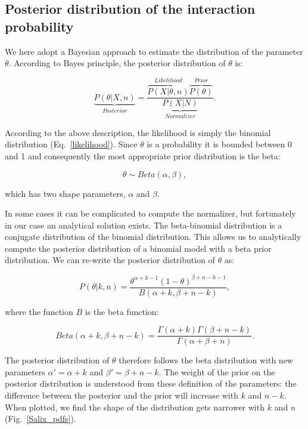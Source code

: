 ﻿\documentclass[12pt]{article}
\begin{document}
    \subsection*{Posterior distribution of the interaction probability}

      We here adopt a Bayesian approach to estimate the distribution of the parameter $\theta$. According to Bayes principle, the posterior distribution of $\theta$ is:

      \begin{equation}
        \underbrace{P(\theta|X,n)}_{Posterior} = \frac{\overbrace{P(X|\theta,n)}^{Likelihood}\overbrace{P(\theta)}^{Prior}}{\underbrace{P(X|N)}_{Normalizer}} .
        \label{posterior}
      \end{equation}

      According to the above description, the likelihood is simply the binomial distribution (Eq.~\ref{likelihood}). Since $\theta$ is a probability it is bounded between 0 and 1 and consequently the most appropriate prior distribution is the beta:

      \begin{equation}
        \theta \sim Beta(\alpha,\beta) , \label{prior}
      \end{equation}

      \noindent which has two shape parameters, $\alpha$ and $\beta$. 

     In some cases it can be complicated to compute the normalizer, but fortunately in our case an analytical solution exists. The beta-binomial distribution is a conjugate distribution of the binomial distribution. This allows us to analytically compute the posterior distribution of a binomial model with a beta prior distribution. We can re-write the posterior distribution of $\theta$ as:

      \begin{equation}
        P(\theta|k,n) = \frac{\theta^{\alpha+k-1}(1-\theta)^{\beta+n-k-1}}{B(\alpha+k,\beta+n-k)} , \label{posterior}
      \end{equation}

      \noindent where the function $B$ is the beta function:

      \begin{equation}
        Beta(\alpha+k,\beta+n-k) = \frac{\Gamma(\alpha+k)\Gamma(\beta+n-k)}{\Gamma(\alpha+\beta+n)} . \label{betafunction}
      \end{equation}

      The posterior distribution of $\theta$ therefore follows the beta distribution with new parameters $\alpha'= \alpha+k$ and $\beta'=\beta+n-k$. The weight of the prior on the posterior distribution is understood from these definition of the parameters: the difference between the posterior and the prior will increase with $k$ and $n-k$. When plotted, we find the shape of the distribution gets narrower with $k$ and $n$ (Fig.~\ref{Salix_pdfs}). 
\end{document}

